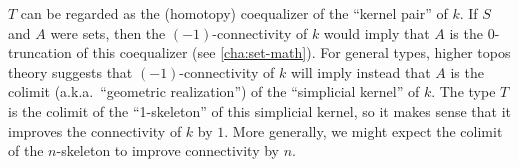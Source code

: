 \documentclass[hott-all.tex]{subfiles}
\begin{document}
% 
% 
\begin{rmk}
  $T$ can be regarded as the (homotopy) coequalizer of the ``kernel pair'' of $k$.
  If $S$ and $A$ were sets, then the $(-1)$-connectivity of $k$ would imply that $A$ is the $0$-truncation of this coequalizer (see \cref{cha:set-math}).
  For general types, higher topos theory suggests that $(-1)$-con\-nec\-tiv\-i\-ty of $k$ will imply instead that $A$ is the colimit (a.k.a.\ ``geometric realization'') of the ``simplicial kernel'' of $k$.
  The type $T$ is the colimit of the ``1-skeleton'' of this simplicial kernel, so it makes sense that it improves the connectivity of $k$ by $1$.
  More generally, we might expect the colimit of the $n$-skeleton to improve connectivity by $n$.
\end{rmk}
% 
% 
\end{document}
